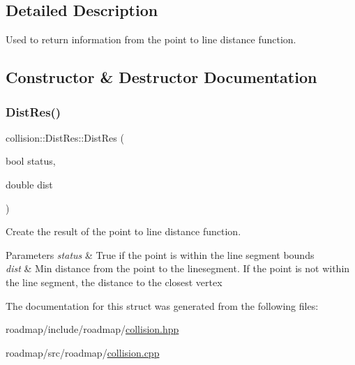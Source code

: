 \subsection{Detailed Description}
Used to return information from the point to line distance function. 

\subsection{Constructor \& Destructor Documentation}
\mbox{\label{structcollision_1_1DistRes_a1275e0b506edcd9aa0cdaa72a61d1ae7}} 
\subsubsection{\texorpdfstring{Dist\+Res()}{DistRes()}}
{\footnotesize\ttfamily collision\+::\+Dist\+Res\+::\+Dist\+Res (\begin{DoxyParamCaption}\item[{bool}]{status,  }\item[{double}]{dist }\end{DoxyParamCaption})}



Create the result of the point to line distance function. 


\begin{DoxyParams}{Parameters}
{\em status} & True if the point is within the line segment bounds \\
\hline
{\em dist} & Min distance from the point to the linesegment. If the point is not within the line segment, the distance to the closest vertex \\
\hline
\end{DoxyParams}


The documentation for this struct was generated from the following files\+:\begin{DoxyCompactItemize}
\item 
roadmap/include/roadmap/\hyperlink{collision_8hpp}{collision.\+hpp}\item 
roadmap/src/roadmap/\hyperlink{collision_8cpp}{collision.\+cpp}\end{DoxyCompactItemize}
